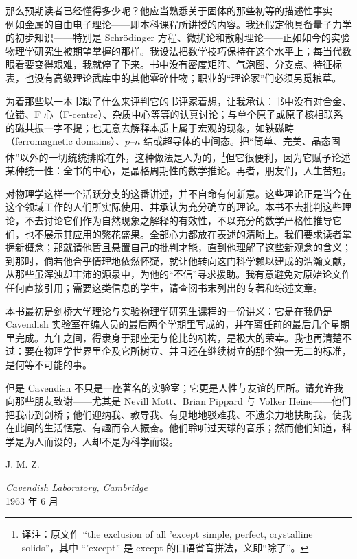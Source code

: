 那么预期读者已经懂得多少呢？他应当熟悉关于固体的那些初等的描述性事实——例如金属的自由电子理论——即本科课程所讲授的内容。我还假定他具备量子力学的初步知识——特别是 Schrödinger 方程、微扰论和散射理论——正如如今的实验物理学研究生被期望掌握的那样。我设法把数学技巧保持在这个水平上；每当代数眼看要变得艰难，我就停了下来。书中没有密度矩阵、气泡图、分支点、特征标表，也没有高级理论武库中的其他零碎什物；职业的“理论家”们必须另觅粮草。

为着那些以一本书缺了什么来评判它的书评家着想，让我承认：书中没有对合金、位错、F 心（F-centre）、杂质中心等等的认真讨论；与单个原子或原子核相联系的磁共振一字不提；也无意去解释本质上属于宏观的现象，如铁磁畴（ferromagnetic domains）、$p$--$n$ 结或超导体的中间态。把“简单、完美、晶态固体”以外的一切统统排除在外，这种做法是人为的，\footnote{译注：原文作 “the exclusion of all 'except simple, perfect, crystalline solids”，其中 “'except” 是 except 的口语省音拼法，义即“除了”。}但它很便利，因为它赋予论述某种统一性：全书的中心，是晶格周期性的数学推论。再者，朋友们，人生苦短。

对物理学这样一个活跃分支的这番讲述，并不自命有何新意。这些理论正是当今在这个领域工作的人们所实际使用、并承认为充分确立的理论。本书不去批判这些理论，不去讨论它们作为自然现象之解释的有效性，不以充分的数学严格性推导它们，也不展示其应用的繁花盛果。全部心力都放在表述的清晰上。我们要求读者掌握新概念；那就请他暂且悬置自己的批判才能，直到他理解了这些新观念的含义；到那时，倘若他合乎情理地依然怀疑，就让他转向这门科学赖以建成的浩瀚文献，从那些虽浑浊却丰沛的源泉中，为他的“不信”寻求援助。我有意避免对原始论文作任何直接引用；需要这类信息的学生，请查阅书末列出的专著和综述文章。

本书最初是剑桥大学理论与实验物理学研究生课程的一份讲义：它是在我仍是 Cavendish 实验室在编人员的最后两个学期里写成的，并在离任前的最后几个星期里完成。九年之间，得隶身于那座无与伦比的机构，是极大的荣幸。我也再清楚不过：要在物理学世界里企及它所树立、并且还在继续树立的那个独一无二的标准，是何等不可能的事。

但是 Cavendish 不只是一座著名的实验室；它更是人性与友谊的居所。请允许我向那些朋友致谢——尤其是 Nevill Mott、Brian Pippard 与 Volker Heine——他们把我带到剑桥；他们迎纳我、教导我、有见地地驳难我、不遗余力地扶助我，使我在此间的生活惬意、有趣而令人振奋。他们聆听过天球的音乐；然而他们知道，科学是为人而设的，人却不是为科学而设。

\begin{flushright}
J. M. Z.
\end{flushright}

\noindent\emph{Cavendish Laboratory, Cambridge}\\
1963 年 6 月

